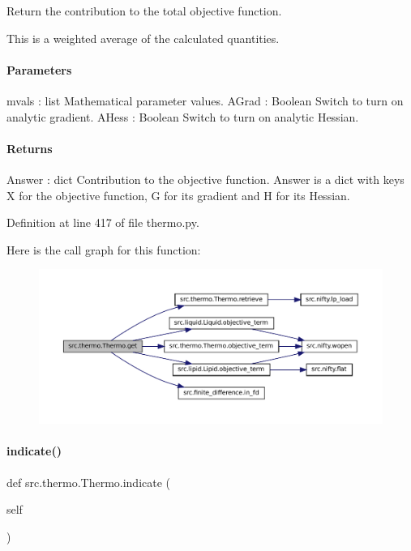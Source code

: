 Return the contribution to the total objective function. 

This is a weighted average of the calculated quantities.

\paragraph*{Parameters }

mvals \+: list Mathematical parameter values. A\+Grad \+: Boolean Switch to turn on analytic gradient. A\+Hess \+: Boolean Switch to turn on analytic Hessian.

\paragraph*{Returns }

Answer \+: dict Contribution to the objective function. {\ttfamily Answer} is a dict with keys {\ttfamily X} for the objective function, {\ttfamily G} for its gradient and {\ttfamily H} for its Hessian. 

Definition at line 417 of file thermo.\+py.

Here is the call graph for this function\+:
\nopagebreak
\begin{figure}[H]
\begin{center}
\leavevmode
\includegraphics[width=350pt]{classsrc_1_1thermo_1_1Thermo_ac47eddac7bd3b77ef6f575941946f4bf_cgraph}
\end{center}
\end{figure}
\mbox{\label{classsrc_1_1thermo_1_1Thermo_a608afc83596d03d41f3860ce4bcedfea}} 
\paragraph{\texorpdfstring{indicate()}{indicate()}}
{\footnotesize\ttfamily def src.\+thermo.\+Thermo.\+indicate (\begin{DoxyParamCaption}\item[{}]{self }\end{DoxyParamCaption})}



